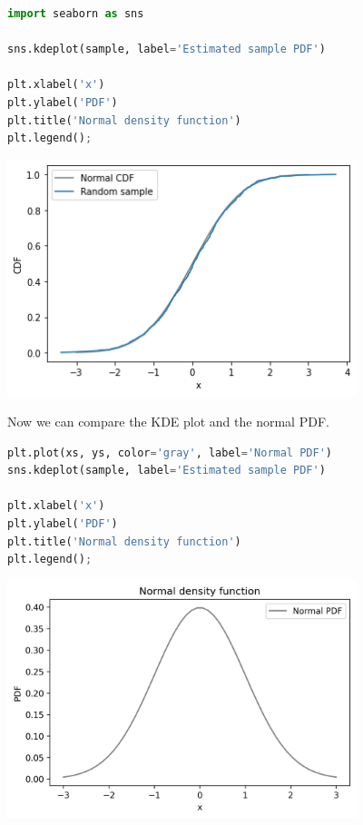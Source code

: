\begin{lstlisting}[language=Python,style=source]
import seaborn as sns

sns.kdeplot(sample, label='Estimated sample PDF')

plt.xlabel('x')
plt.ylabel('PDF')
plt.title('Normal density function')
plt.legend();
\end{lstlisting}

\begin{center}
\includegraphics[width=4in]{chapters/08_distributions_files/08_distributions_116_0.png}
\end{center}

Now we can compare the KDE plot and the normal PDF.

\begin{lstlisting}[language=Python,style=source]
plt.plot(xs, ys, color='gray', label='Normal PDF')
sns.kdeplot(sample, label='Estimated sample PDF')

plt.xlabel('x')
plt.ylabel('PDF')
plt.title('Normal density function')
plt.legend();
\end{lstlisting}

\begin{center}
\includegraphics[width=4in]{chapters/08_distributions_files/08_distributions_118_0.png}
\end{center}

